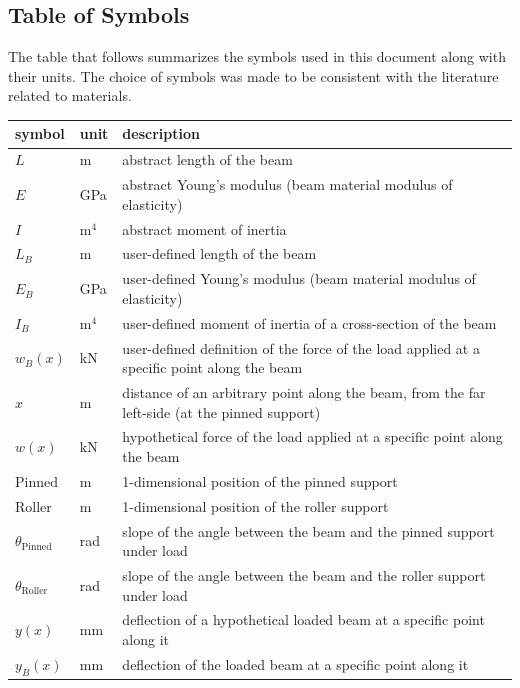 \documentclass[12pt]{article}
\begin{document}
\subsection{Table of Symbols}

The table that follows summarizes the symbols used in this document along with
their units.  The choice of symbols was made to be consistent with the
literature related to materials.

\renewcommand{\arraystretch}{1.2}
\begin{longtable*}{l l p{12cm}}
    \toprule
    \textbf{symbol} & \textbf{unit} & \textbf{description}\\
    \midrule
    \(L\) & \si{\metre} & abstract length of the beam \\
    \(E\) & \si{\giga\pascal} & abstract Young's modulus (beam material modulus of elasticity) \\
    \(I\) & \(\si{\metre{}}^{4}\) & abstract moment of inertia \\
    \(L_{B}\) & \si{\metre} & user-defined length of the beam \\
    \(E_{B}\) & \si{\giga\pascal} & user-defined Young's modulus (beam material modulus of elasticity) \\
    \(I_{B}\) & \(\si{\metre{}}^{4}\) & user-defined moment of inertia of a cross-section of the beam \\
    \(w_B(x)\) & \si{\kilo\newton} & user-defined definition of the force of the load applied at a specific point along the beam \\
    \(x\) & \si{\metre} & distance of an arbitrary point along the beam, from the far left-side (at the pinned support) \\
    \(w(x)\) & \si{\kilo\newton} & hypothetical force of the load applied at a specific point along the beam \\
    \(\text{Pinned}\) & \si{\metre} & 1-dimensional position of the pinned support \\
    \(\text{Roller}\) & \si{\metre} & 1-dimensional position of the roller support \\
    \(\theta{}_{\text{Pinned}}\) & \si{\radian} & slope of the angle between the beam and the pinned support under load \\
    \(\theta{}_{\text{Roller}}\) & \si{\radian} & slope of the angle between the beam and the roller support under load \\
    \(y(x)\) & \si{\milli\metre} & deflection of a hypothetical loaded beam at a specific point along it \\
    \(y_{B}(x)\) & \si{\milli\metre} & deflection of the loaded beam at a specific point along it \\
    \bottomrule
\end{longtable*}
\end{document}
